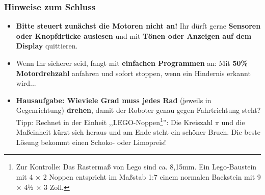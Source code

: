\documentclass{beamer}
\begin{document}
\begin{frame}
\frametitle{Hinweise zum Schluss}
\begin{itemize}
\item
\textbf{Bitte steuert zunächst die Motoren nicht an!} Ihr dürft gerne \textbf{Sensoren oder Knopfdrücke auslesen} und mit \textbf{Tönen oder Anzeigen auf dem Display}  quittieren.
\item Wenn Ihr sicherer seid, fangt mit \textbf{einfachen Programmen} an: Mit \textbf{50\% Motordrehzahl} anfahren und sofort stoppen, wenn ein Hindernis erkannt wird...
\item \textbf{Hausaufgabe: Wieviele Grad muss jedes Rad} (jeweils in Gegenrichtung) \textbf{drehen}, damit der Roboter genau gegen Fahrtrichtung steht? Tipp: Rechnet in der Einheit ,,LEGO-Noppen\footnote{Zur Kontrolle: Das Rastermaß von Lego sind ca. 8,15mm. Ein Lego-Baustein mit 4 × 2 Noppen entspricht im Maßstab 1:7 einem normalen Backstein mit 9 × 4½ × 3 Zoll.}'': Die Kreiszahl $\pi$ und die Maßeinheit kürzt sich heraus und am Ende steht ein schöner Bruch. Die beste Lösung bekommt einen Schoko- oder Limopreis!
\end{itemize}
\end{frame}

\end{document}
